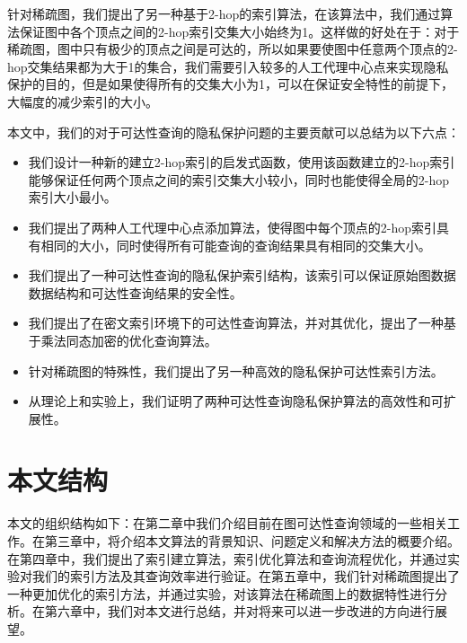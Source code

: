 针对稀疏图，我们提出了另一种基于2-hop的索引算法\ppmuihop ，在该算法中，我们通过算法保证图中各个顶点之间的2-hop索引交集大小始终为1。这样做的好处在于：对于稀疏图，图中只有极少的顶点之间是可达的，所以如果要使图中任意两个顶点的2-hop交集结果都为大于1的集合，我们需要引入较多的人工代理中心点来实现隐私保护的目的，但是如果使得所有的交集大小为1，可以在保证安全特性的前提下，大幅度的减少索引的大小。

本文中，我们的对于可达性查询的隐私保护问题的主要贡献可以总结为以下六点：
\begin{itemize}
\item 我们设计一种新的建立2-hop索引的启发式函数，使用该函数建立的2-hop索引能够保证任何两个顶点之间的索引交集大小较小，同时也能使得全局的2-hop 索引大小最小。
\item 我们提出了两种人工代理中心点添加算法，使得图中每个顶点的2-hop索引具有相同的大小，同时使得所有可能查询的查询结果具有相同的交集大小。
\item 我们提出了一种可达性查询的隐私保护索引结构\pphop ，该索引可以保证原始图数据数据结构和可达性查询结果的安全性。
\item 我们提出了在密文索引环境下的可达性查询算法，并对其优化，提出了一种基于乘法同态加密的优化查询算法。
\item 针对稀疏图的特殊性，我们提出了另一种高效的隐私保护可达性索引方法\ppmuihop 。
\item 从理论上和实验上，我们证明了两种可达性查询隐私保护算法的高效性和可扩展性。
\end{itemize}


\section{本文结构}
本文的组织结构如下：在第二章中我们介绍目前在图可达性查询领域的一些相关工作。在第三章中，将介绍本文算法的背景知识、问题定义和解决方法的概要介绍。在第四章中，我们提出了\pphop 索引建立算法，索引优化算法和查询流程优化，并通过实验对我们的索引方法及其查询效率进行验证。在第五章中，我们针对稀疏图提出了一种更加优化的\ppmuihop 索引方法，并通过实验，对该算法在稀疏图上的数据特性进行分析。在第六章中，我们对本文进行总结，并对将来可以进一步改进的方向进行展望。
